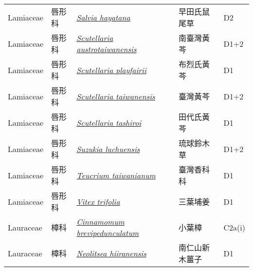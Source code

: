 {\begin{longtable}{p{2.5cm}p{2cm}p{5cm}p{2.5cm}p{3cm}}
    Lamiaceae & 唇形科 & \href{http://www.theplantlist.org/tpl1.1/search?q=Salvia+hayatana}{\textit{Salvia hayatana} } & 早田氏鼠尾草 & D2　 \index{Salvia@\textit{Salvia}!hayatana@\textit{hayatana}}  \index{早田氏鼠尾草} \\
    Lamiaceae & 唇形科 & \href{http://www.theplantlist.org/tpl1.1/search?q=Scutellaria+austrotaiwanensis}{\textit{Scutellaria austrotaiwanensis} } & 南臺灣黃芩 & D1+2 \index{Scutellaria@\textit{Scutellaria}!austrotaiwanensis@\textit{austrotaiwanensis}}  \index{南臺灣黃芩} \\
    Lamiaceae & 唇形科 & \href{http://www.theplantlist.org/tpl1.1/search?q=Scutellaria+playfairii}{\textit{Scutellaria playfairii} } & 布烈氏黃芩 & D1 \index{Scutellaria@\textit{Scutellaria}!playfairii@\textit{playfairii}}  \index{布烈氏黃芩} \\
    Lamiaceae & 唇形科 & \href{http://www.theplantlist.org/tpl1.1/search?q=Scutellaria+taiwanensis}{\textit{Scutellaria taiwanensis} } & 臺灣黃芩 & D1+2 \index{Scutellaria@\textit{Scutellaria}!taiwanensis@\textit{taiwanensis}}  \index{臺灣黃芩} \\
    Lamiaceae & 唇形科 & \href{http://www.theplantlist.org/tpl1.1/search?q=Scutellaria+tashiroi}{\textit{Scutellaria tashiroi} } & 田代氏黃芩 & D1 \index{Scutellaria@\textit{Scutellaria}!tashiroi@\textit{tashiroi}}  \index{田代氏黃芩} \\
    Lamiaceae & 唇形科 & \href{http://www.theplantlist.org/tpl1.1/search?q=Suzukia+luchuensis}{\textit{Suzukia luchuensis} } & 琉球鈴木草 & D1+2 \index{Suzukia@\textit{Suzukia}!luchuensis@\textit{luchuensis}}  \index{琉球鈴木草} \\
    Lamiaceae & 唇形科 & \href{http://www.theplantlist.org/tpl1.1/search?q=Teucrium+taiwanianum}{\textit{Teucrium taiwanianum} } & 臺灣香科科 & D1 \index{Teucrium@\textit{Teucrium}!taiwanianum@\textit{taiwanianum}}  \index{臺灣香科科} \\
    Lamiaceae & 唇形科 & \href{http://www.theplantlist.org/tpl1.1/search?q=Vitex+trifolia}{\textit{Vitex trifolia} } & 三葉埔姜 & D1 \index{Vitex@\textit{Vitex}!trifolia@\textit{trifolia}}  \index{三葉埔姜} \\
    Lauraceae & 樟科 & \href{http://www.theplantlist.org/tpl1.1/search?q=Cinnamomum+brevipedunculatum}{\textit{Cinnamomum brevipedunculatum} } & 小葉樟 & C2a(i) \index{Cinnamomum@\textit{Cinnamomum}!brevipedunculatum@\textit{brevipedunculatum}}  \index{小葉樟} \\
    Lauraceae & 樟科 & \href{http://www.theplantlist.org/tpl1.1/search?q=Neolitsea+hiiranensis}{\textit{Neolitsea hiiranensis} } & 南仁山新木薑子 & D1 \index{Neolitsea@\textit{Neolitsea}!hiiranensis@\textit{hiiranensis}}  \index{南仁山新木薑子} \\

\end{longtable}}
